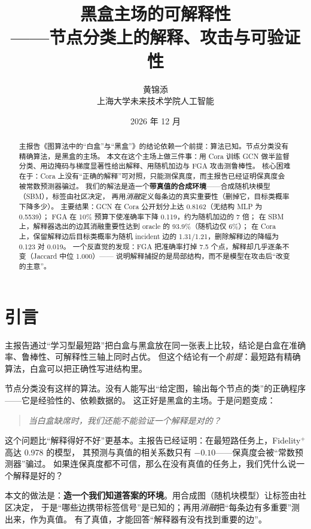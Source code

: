 \documentclass[a4paper,10pt]{article}
\title{\bfseries 黑盒主场的可解释性\\[2pt]
\large ——节点分类上的解释、攻击与可验证性}
\author{黄锦添\quad 25121605\\ 上海大学未来技术学院\quad 人工智能}
\date{2026 年 12 月}
\begin{document}
\maketitle

\begin{abstract}
\noindent
主报告《图算法中的“白盒”与“黑盒”》的结论依赖一个前提：算法已知。节点分类没有精确算法，是黑盒的主场。
本文在这个主场上做三件事：用 Cora 训练 GCN 做半监督分类、用边掩码与梯度显著性给出解释、用随机加边与 FGA 攻击测鲁棒性。
核心困难在于：Cora 上没有“正确的解释”可对照，只能测保真度，而主报告已经证明保真度会被常数预测器骗过。
我们的解法是造一个\textbf{带真值的合成环境}——合成随机块模型（SBM），标签由社区决定，
再用\emph{消融}定义每条边的真实重要性（删掉它，目标类概率下降多少）。
主要结果：GCN 在 Cora 公开划分上达 0.8162（无结构 MLP 为 0.5539）；
FGA 在 10\% 预算下使准确率下降 0.119，约为随机加边的 7 倍；
在 SBM 上，解释器选出的边其消融重要性达到 oracle 的 93.9\%（随机边仅 6\%）；
在 Cora 上，保留解释边后目标类概率为随机 incident 边的 1.31/1.21，删除解释边的降幅为 0.123 对 0.019。
一个反直觉的发现：FGA 把准确率打掉 7.5 个点，解释却几乎逐条不变（Jaccard 中位 1.000）——
说明解释捕捉的是局部结构，而不是模型在攻击后“改变的主意”。
\end{abstract}

\tableofcontents
\vspace{-1.2em}

\section{引言}

主报告通过“学习型最短路”把白盒与黑盒放在同一张表上比较，结论是白盒在准确率、鲁棒性、可解释性三轴上同时占优。
但这个结论有一个\emph{前提}：最短路有精确算法，白盒可以把正确性写进结构里。

节点分类没有这样的算法。没有人能写出“给定图，输出每个节点的类”的正确程序——它是经验性的、依赖数据的。
这正好是黑盒的主场。于是问题变成：

\begin{quote}
\emph{当白盒缺席时，我们还能不能验证一个解释是对的？}
\end{quote}

这个问题比“解释得好不好”更基本。主报告已经证明：在最短路任务上，Fidelity$^+$ 高达 0.978 的模型，
其预测与真值的相关系数只有 $-0.10$——保真度会被“常数预测器”骗过。
如果连保真度都不可信，那么在没有真值的任务上，我们凭什么说一个解释是好的？

本文的做法是：\textbf{造一个我们知道答案的环境}。用合成图（随机块模型）让标签由社区决定，
于是“哪些边携带标签信号”是已知的；再用\emph{消融}把“每条边有多重要”测出来，作为真值。
有了真值，才能回答“解释器有没有找到重要的边”。
\end{document}
